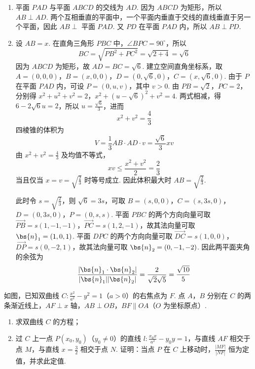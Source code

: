 \begin{solution}
\begin{enumerate}
\item 平面 \(PAD\) 与平面 \(ABCD\) 的交线为 \(AD\). 因为 \(ABCD\) 为矩形，所以 \(AB\perp AD\). 两个互相垂直的平面中，一个平面内垂直于交线的直线垂直于另一个平面，因此 \(AB\perp\) 平面 \(PAD\). 又 \(PD\) 在平面 \(PAD\) 内，所以 \(AB\perp PD\).

\item 设 \(AB=x\). 在直角三角形 \(PBC\) 中，\(\angle BPC=90^{\circ}\)，所以
\[
BC=\sqrt{PB^2+PC^2}=\sqrt{2+4}=\sqrt{6}
\]
因为 \(ABCD\) 为矩形，故 \(AD=BC=\sqrt{6}\). 建立空间直角坐标系，取
\(A=(0,0,0)\)，\(B=(x,0,0)\)，\(D=(0,\sqrt{6},0)\)，\(C=(x,\sqrt{6},0)\).
由于 \(P\) 在平面 \(PAD\) 内，可设 \(P=(0,u,v)\)，其中 \(v>0\). 由 \(PB=\sqrt{2}\)，\(PC=2\)，分别得
\(x^2+u^2+v^2=2\)，\(x^2+(u-\sqrt{6})^2+v^2=4\).
两式相减，得 \(6-2\sqrt{6}u=2\)，所以 \(u=\frac{\sqrt{6}}{3}\)，进而
\[
x^2+v^2=\frac{4}{3}
\]
四棱锥的体积为
\[
V=\frac{1}{3}AB\cdot AD\cdot v=\frac{\sqrt{6}}{3}xv
\]
由 \(x^2+v^2=\frac{4}{3}\) 及均值不等式，
\[
xv\leqslant\frac{x^2+v^2}{2}=\frac{2}{3}
\]
当且仅当 \(x=v=\sqrt{\frac{2}{3}}\) 时等号成立. 因此体积最大时 \(AB=\sqrt{\frac{2}{3}}\).

此时令 \(s=\sqrt{\frac{2}{3}}\)，则 \(\sqrt{6}=3s\)，可取
\(B=(s,0,0)\)，\(C=(s,3s,0)\)，\(D=(0,3s,0)\)，\(P=(0,s,s)\).
平面 \(PBC\) 的两个方向向量可取 \(\overrightarrow{PB}=s(1,-1,-1)\)，\(\overrightarrow{PC}=s(1,2,-1)\)，故其法向量可取 \(\bs{n}_1=(1,0,1)\). 平面 \(DPC\) 的两个方向向量可取 \(\overrightarrow{DC}=s(1,0,0)\)，\(\overrightarrow{DP}=s(0,-2,1)\)，故其法向量可取 \(\bs{n}_2=(0,-1,-2)\). 因此两平面夹角的余弦为
\[
\frac{|\bs{n}_1\cdot\bs{n}_2|}{|\bs{n}_1||\bs{n}_2|}
=\frac{2}{\sqrt{2}\sqrt{5}}=\frac{\sqrt{10}}{5}
\]
\end{enumerate}
\end{solution}

\begin{problem}
如图，已知双曲线 \(C: \frac{x^2}{a^2} - y^2 = 1\)（\(a > 0\)）的右焦点为 \(F\). 点 \(A\)，\(B\) 分别在 \(C\) 的两条渐近线上，\(AF \perp x\) 轴，\(AB \perp OB\)，\(BF \parallel OA\)（\(O\) 为坐标原点）.

\begin{enumerate}
\item 求双曲线 \(C\) 的方程；
\item 过 \(C\) 上一点 \(P(x_0, y_0)\)（\(y_0 \neq 0\)）的直线 \(l: \frac{x_0 x}{a^2} - y_0 y = 1\)，与直线 \(AF\) 相交于点 \(M\)，与直线 \(x = \frac{3}{2}\) 相交于点 \(N\). 证明：当点 \(P\) 在 \(C\) 上移动时，\(\frac{|MF|}{|NF|}\) 恒为定值，并求此定值.
\end{enumerate}
\end{problem}

